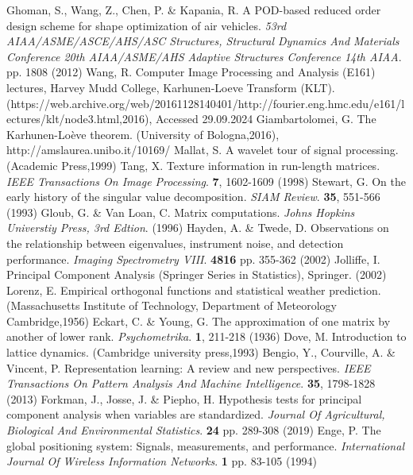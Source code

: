\documentclass[sn-mathphys-num]{sn-jnl}%
\begin{document}
\begin{thebibliography}{000}
Ghoman, S., Wang, Z., Chen, P. \& Kapania, R. A POD-based reduced order design scheme for shape optimization of air vehicles. {\em 53rd AIAA/ASME/ASCE/AHS/ASC Structures, Structural Dynamics And Materials Conference 20th AIAA/ASME/AHS Adaptive Structures Conference 14th AIAA}. pp. 1808 (2012)
Wang, R. Computer Image Processing and Analysis (E161) lectures, Harvey Mudd College, Karhunen-Loeve Transform (KLT). (https://web.archive.org/web/20161128140401/http://fourier.eng.hmc.edu/e161/lectures/klt/node3.html,2016), Accessed 29.09.2024
Giambartolomei, G. The Karhunen-Loève theorem. (University of Bologna,2016), http://amslaurea.unibo.it/10169/
Mallat, S. A wavelet tour of signal processing. (Academic Press,1999)
Tang, X. Texture information in run-length matrices. {\em IEEE Transactions On Image Processing}. \textbf{7}, 1602-1609 (1998)
Stewart, G. On the early history of the singular value decomposition. {\em SIAM Review}. \textbf{35}, 551-566 (1993)
Gloub, G. \& Van Loan, C. Matrix computations. {\em Johns Hopkins Universtiy Press, 3rd Edtion}. (1996)
Hayden, A. \& Twede, D. Observations on the relationship between eigenvalues, instrument noise, and detection performance. {\em Imaging Spectrometry VIII}. \textbf{4816} pp. 355-362 (2002)
Jolliffe, I. Principal Component Analysis (Springer Series in Statistics), Springer.  (2002)
Lorenz, E. Empirical orthogonal functions and statistical weather prediction. (Massachusetts Institute of Technology, Department of Meteorology Cambridge,1956)
Eckart, C. \& Young, G. The approximation of one matrix by another of lower rank. {\em Psychometrika}. \textbf{1}, 211-218 (1936)
Dove, M. Introduction to lattice dynamics. (Cambridge university press,1993)
Bengio, Y., Courville, A. \& Vincent, P. Representation learning: A review and new perspectives. {\em IEEE Transactions On Pattern Analysis And Machine Intelligence}. \textbf{35}, 1798-1828 (2013)
Forkman, J., Josse, J. \& Piepho, H. Hypothesis tests for principal component analysis when variables are standardized. {\em Journal Of Agricultural, Biological And Environmental Statistics}. \textbf{24} pp. 289-308 (2019)
Enge, P. The global positioning system: Signals, measurements, and performance. {\em International Journal Of Wireless Information Networks}. \textbf{1} pp. 83-105 (1994)

\end{thebibliography}
\end{document}

